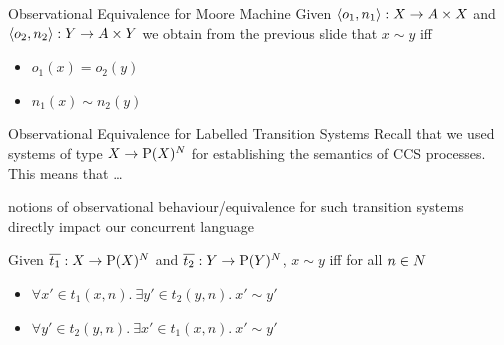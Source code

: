 \documentclass[aspectratio=169]{beamer}
\begin{document}
\begin{frame}{Observational Equivalence for Moore Machine}
  Given $\langle o_1, n_1 \rangle : X \to A \times X$ and
  $\langle o_2, n_2 \rangle : Y \to A \times Y$ we obtain from the previous slide 
  that $x \sim y$ iff
  \begin{itemize}
  \item $o_1(x) = o_2(y)$
  \item $n_1(x) \sim n_2(y)$
  \end{itemize}
\end{frame}

\begin{frame}{Observational Equivalence for Labelled Transition Systems}
  Recall that we used systems of type $X \to \mathrm{P}(X)^N$ for establishing the
  \alert{semantics} of \alert{CCS processes}. This means that \dots

  notions of observational behaviour/equivalence for such transition systems
  directly impact our concurrent language

  \vfill Given $\overline{t_1} : X \to \mathrm{P}(X)^N$ and
  $\overline{t_2} : Y \to \mathrm{P}(Y)^N$, $x \sim y$ iff for all $n \in N$
  \begin{itemize}
  \item $\forall x' \in t_1(x,n).\  \exists y' \in t_2(y,n).\ x' \sim y'$
  \item $\forall y' \in t_2(y,n).\ \exists x' \in t_1(x,n).\ x' \sim y'$
  \end{itemize}
\end{frame}



  
\end{document}
